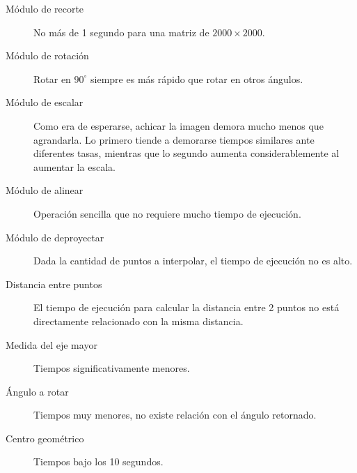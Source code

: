 \begin{description}
	\item[Módulo de recorte] No más de 1 segundo para una matriz de $2000 \times 2000$.
	\item[Módulo de rotación] Rotar en $90^\circ$ siempre es más rápido que rotar en otros ángulos.
	\item[Módulo de escalar] Como era de esperarse, achicar la imagen demora mucho menos que agrandarla. Lo primero tiende a demorarse tiempos similares ante diferentes tasas, mientras que lo segundo aumenta considerablemente al aumentar la escala.
	\item[Módulo de alinear] Operación sencilla que no requiere mucho tiempo de ejecución.
	\item[Módulo de deproyectar] Dada la cantidad de puntos a interpolar, el tiempo de ejecución no es alto.
	\item[Distancia entre puntos] El tiempo de ejecución para calcular la distancia entre 2 puntos no está directamente relacionado con la misma distancia.
	\item[Medida del eje mayor] Tiempos significativamente menores.
	\item[Ángulo a rotar] Tiempos muy menores, no existe relación con el ángulo retornado.
	\item[Centro geom\'etrico] Tiempos bajo los 10 segundos.
\end{description}



